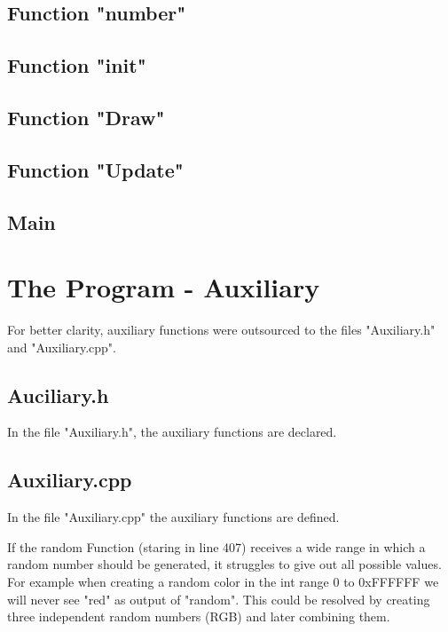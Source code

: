 \documentclass[11pt,titlepage]{article}
\def\ContinueLineNumber{\lstset{firstnumber=last}}
\begin{document}
		\subsection{Function "number"}
			\ContinueLineNumber
			
			
		\subsection{Function "init"}
			\ContinueLineNumber
			
			
		\subsection{Function "Draw"}
			\ContinueLineNumber
			
			
		\subsection{Function "Update"}
			\ContinueLineNumber
			
			
		\subsection{Main}
			\ContinueLineNumber
			
			
		\section{The Program - Auxiliary}
		For better clarity, auxiliary functions were outsourced to the files 
		"Auxiliary.h" and "Auxiliary.cpp".
			\subsection{Auciliary.h}
			In the file "Auxiliary.h", the auxiliary functions are declared.
				
			\subsection{Auxiliary.cpp}
			In the file "Auxiliary.cpp" the auxiliary functions are defined.
			
			If the random Function (staring in line 407) receives a wide range in which a random number should be generated, it struggles to give out all possible values.
			For example when creating a random color in the int range 0 to 0xFFFFFF we will never see "red" as output of "random". This could be resolved by creating three independent random numbers (RGB) and later combining them.
				
\end{document}
